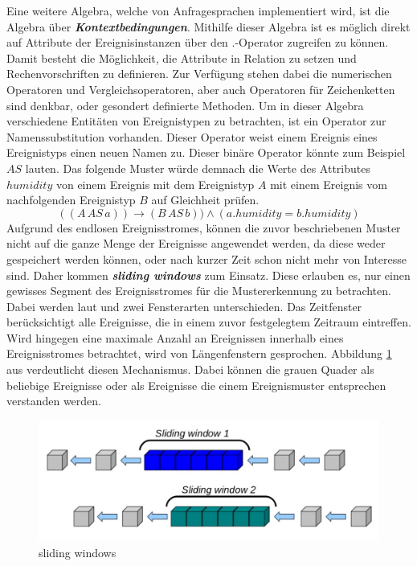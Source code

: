\documentclass{acm_proc_article-sp}
\begin{document}
Eine weitere Algebra, welche von Anfragesprachen implementiert wird, ist die Algebra über 
\textbf{\textit{Kontextbedingungen}}. Mithilfe dieser Algebra ist es möglich direkt 
auf Attribute der Ereignisinstanzen über den $.$-Operator zugreifen zu können. Damit 
besteht die Möglichkeit, die Attribute in Relation zu setzen und Rechenvorschriften zu 
definieren. Zur Verfügung stehen dabei die numerischen Operatoren und 
Vergleichsoperatoren, aber auch Operatoren für Zeichenketten sind denkbar, oder gesondert 
definierte Methoden. Um in dieser Algebra verschiedene Entitäten von Ereignistypen zu 
betrachten, ist ein Operator zur Namenssubstitution vorhanden. Dieser Operator weist 
einem Ereignis eines Ereignistyps einen neuen Namen zu. Dieser binäre Operator könnte zum 
Beispiel $AS$ lauten. Das folgende Muster würde demnach die Werte des Attributes 
$humidity$ von einem Ereignis mit dem Ereignistyp $A$ mit einem Ereignis vom 
nachfolgenden Ereignistyp $B$ auf Gleichheit prüfen.
$$((A\, AS\, a)) \rightarrow (B\, AS\, b)) \land (a.humidity = b.humidity)$$
Aufgrund des endlosen Ereignisstromes, können die zuvor beschriebenen Muster nicht auf 
die ganze Menge der Ereignisse angewendet werden, da diese weder gespeichert werden 
können, oder nach kurzer Zeit schon nicht mehr von Interesse sind. Daher kommen 
\textbf{\textit{sliding windows}} zum Einsatz. Diese erlauben es, nur einen 
gewisses Segment des Ereignisstromes für die Mustererkennung zu betrachten. Dabei werden 
laut \cite{bruns} und \cite{hedtstuck} zwei Fensterarten unterschieden. Das Zeitfenster 
berücksichtigt alle Ereignisse, die in einem zuvor festgelegtem Zeitraum eintreffen. 
Wird hingegen eine maximale Anzahl an Ereignissen innerhalb eines 
Ereignisstromes betrachtet, wird von Längenfenstern gesprochen. Abbildung 
\ref{img:sliding-windows} aus \cite{drools-slide} verdeutlicht diesen Mechanismus. Dabei 
können die grauen Quader als beliebige Ereignisse oder als Ereignisse die einem 
Ereignismuster entsprechen verstanden werden.

\begin{figure}[H]
    \centering
    \includegraphics[width=\linewidth]{img/sliding-windows.png}
    \caption{sliding windows}
    \label{img:sliding-windows}
\end{figure}
\end{document}
